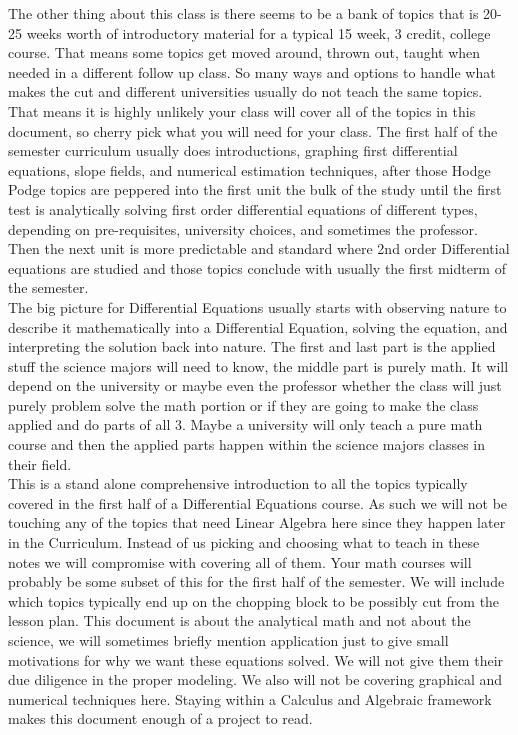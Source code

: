 \documentclass[12pt]{article}
\begin{document}
The other thing about this class is there seems to be a bank of topics that is 20-25 weeks worth of introductory material for a typical 15 week, 3 credit, college course. That means some topics get moved around, thrown out, taught when needed in a different follow up class. So many ways and options to handle what makes the cut and different universities usually do not teach the same topics. That means it is highly unlikely your class will cover all of the topics in this document, so cherry pick what you will need for your class. The first half of the semester curriculum usually does introductions, graphing first differential equations, slope fields, and numerical estimation techniques, after those Hodge Podge topics are peppered into the first unit the bulk of the study until the first test is analytically solving first order differential equations of different types, depending on pre-requisites, university choices, and sometimes the professor. Then the next unit is more predictable and standard where 2nd order Differential equations are studied and those topics conclude with usually the first midterm of the semester. \\

The big picture for Differential Equations usually starts with observing nature to describe it mathematically into a Differential Equation, solving the equation, and interpreting the solution back into nature. The first and last part is the applied stuff the science majors will need to know, the middle part is purely math. It will depend on the university or maybe even the professor whether the class will just purely problem solve the math portion or if they are going to make the class applied and do parts of all 3. Maybe a university will only teach a pure math course and then the applied parts happen within the science majors classes in their field. \\

This is a stand alone comprehensive introduction to all the topics typically covered in the first half of a Differential Equations course. As such we will not be touching any of the topics that need Linear Algebra here since they happen later in the Curriculum. Instead of us picking and choosing what to teach in these notes we will compromise with covering all of them. Your math courses will probably be some subset of this for the first half of the semester. We will include which topics typically end up on the chopping block to be possibly cut from the lesson plan. This document is about the analytical math and not about the science, we will sometimes briefly mention application just to give small motivations for why we want these equations solved. We will not give them their due diligence in the proper modeling. We also will not be covering graphical and numerical techniques here. Staying within a Calculus and Algebraic framework makes this document enough of a project to read.
\end{document}
